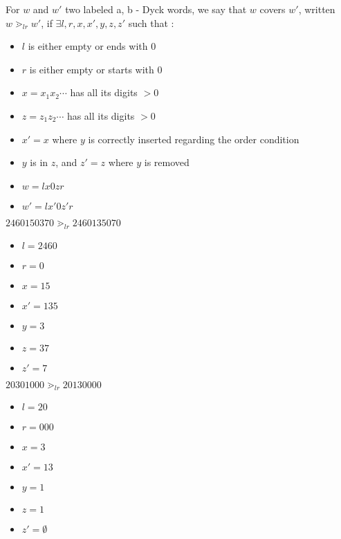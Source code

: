 \begin{definition}[$\gtrdot_{lr}$]
    For $w$ and $w'$ two labeled a, b - Dyck words, we say
    that $w$ covers $w'$, written $w \gtrdot_{lr} w'$,
    if $\exists l, r, x, x', y, z, z'$ such that :
    \begin{itemize}
        \item $l$ is either empty or ends with $0$
        \item $r$ is either empty or starts with $0$
        \item $x = x_1x_2 \cdots$ has all its digits $> 0$
        \item $z = z_1z_2 \cdots$ has all its digits $> 0$
        \item $x' = x$ where $y$ is correctly inserted
            regarding the order condition
        \item $y$ is in $z$, and $z' = z$ where $y$ is removed
        \item $w = lx0zr$
        \item $w' = lx'0z'r$
    \end{itemize}  

\end{definition}

\begin{example}[$a > b : a = 7, b = 3$]
    $2460150370 \gtrdot_{lr} 2460135070$
    \begin{itemize}
        \item $l = 2460$
        \item $r = 0$
        \item $x = 15$
        \item $x' = 135$
        \item $y = 3$
        \item $z = 37$
        \item $z' = 7$
    \end{itemize}
\end{example}

\begin{example}[$a < b : a = 3, b = 5$]
    $20301000 \gtrdot_{lr} 20130000 $
    \begin{itemize}
        \item $l = 20$
        \item $r = 000$
        \item $x = 3$
        \item $x' = 13$
        \item $y = 1$
        \item $z = 1$
        \item $z' = \emptyset$
    \end{itemize}
\end{example}

